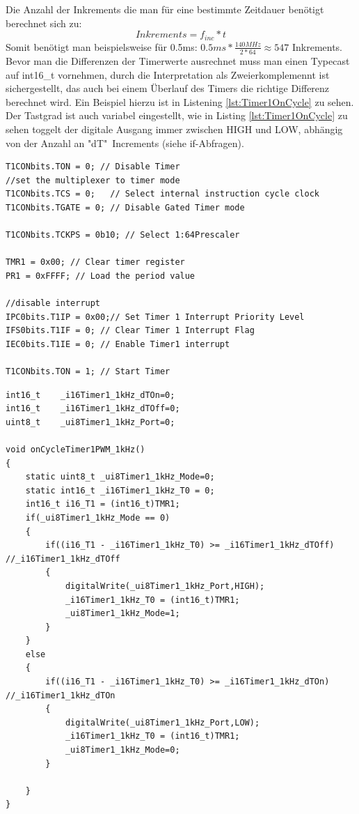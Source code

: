 Die Anzahl der Inkrements die man für eine bestimmte Zeitdauer benötigt berechnet sich zu:
\begin{equation}\label{key}
Inkrements=f_{inc}*t
\end{equation}
Somit benötigt man beispielsweise für 0.5ms: $0.5ms*\frac{140MHz}{2*64}≈547$ Inkrements.\newline \newline
Bevor man die Differenzen der Timerwerte ausrechnet muss man einen Typecast auf int16\_t vornehmen, durch die Interpretation als Zweierkomplemennt ist sichergestellt, das auch bei einem Überlauf des Timers die richtige Differenz berechnet wird. Ein Beispiel hierzu ist in Listening \ref{lst:Timer1OnCycle} zu sehen.
\newline Der Tastgrad ist auch variabel eingestellt, wie in Listing \ref{lst:Timer1OnCycle} zu sehen toggelt der digitale Ausgang immer zwischen HIGH und LOW, abhängig von der Anzahl an "dT"\ Increments (siehe if-Abfragen).


\begin{lstlisting}[frame=htrbl, caption={Timer1 Configuration}, label={lst:Timer1Conf}]
T1CONbits.TON = 0; // Disable Timer
//set the multiplexer to timer mode
T1CONbits.TCS = 0;   // Select internal instruction cycle clock
T1CONbits.TGATE = 0; // Disable Gated Timer mode

T1CONbits.TCKPS = 0b10; // Select 1:64Prescaler

TMR1 = 0x00; // Clear timer register
PR1 = 0xFFFF; // Load the period value

//disable interrupt
IPC0bits.T1IP = 0x00;// Set Timer 1 Interrupt Priority Level
IFS0bits.T1IF = 0; // Clear Timer 1 Interrupt Flag
IEC0bits.T1IE = 0; // Enable Timer1 interrupt 

T1CONbits.TON = 1; // Start Timer
\end{lstlisting}

\begin{lstlisting}[frame=htrbl, caption={Timer1 on Cycle}, label={lst:Timer1OnCycle}]
int16_t    _i16Timer1_1kHz_dTOn=0;
int16_t    _i16Timer1_1kHz_dTOff=0;
uint8_t    _ui8Timer1_1kHz_Port=0;

void onCycleTimer1PWM_1kHz()
{
	static uint8_t _ui8Timer1_1kHz_Mode=0;
	static int16_t _i16Timer1_1kHz_T0 = 0;
	int16_t i16_T1 = (int16_t)TMR1;
	if(_ui8Timer1_1kHz_Mode == 0)
	{
		if((i16_T1 - _i16Timer1_1kHz_T0) >= _i16Timer1_1kHz_dTOff) //_i16Timer1_1kHz_dTOff
		{
			digitalWrite(_ui8Timer1_1kHz_Port,HIGH);
			_i16Timer1_1kHz_T0 = (int16_t)TMR1;
			_ui8Timer1_1kHz_Mode=1;        
		}
	}
	else
	{
		if((i16_T1 - _i16Timer1_1kHz_T0) >= _i16Timer1_1kHz_dTOn) //_i16Timer1_1kHz_dTOn
		{
			digitalWrite(_ui8Timer1_1kHz_Port,LOW);
			_i16Timer1_1kHz_T0 = (int16_t)TMR1;
			_ui8Timer1_1kHz_Mode=0;       
		}

	}  	
}
\end{lstlisting}

